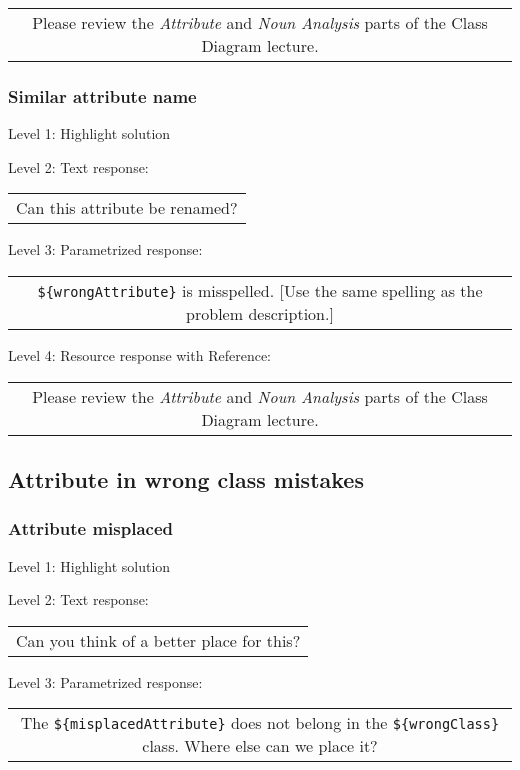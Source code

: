 \begin{tabular}{|c}
Please review the \textit{Attribute} and \textit{Noun Analysis} parts of the Class Diagram lecture.
\end{tabular} \medskip


\subsubsection{Similar attribute name}

\noindent Level 1: Highlight solution \medskip

\noindent Level 2: Text response: \medskip

\begin{tabular}{|c}
Can this attribute be renamed?
\end{tabular} \medskip

\noindent Level 3: Parametrized response: \medskip

\begin{tabular}{|c}
\verb|${wrongAttribute}| is misspelled. [Use the same spelling as the problem description.]
\end{tabular} \medskip

\noindent Level 4: Resource response with Reference:

\begin{tabular}{|c}
Please review the \textit{Attribute} and \textit{Noun Analysis} parts of the Class Diagram lecture.
\end{tabular} \medskip


\subsection{Attribute in wrong class mistakes}

\subsubsection{Attribute misplaced}

\noindent Level 1: Highlight solution \medskip

\noindent Level 2: Text response: \medskip

\begin{tabular}{|c}
Can you think of a better place for this?
\end{tabular} \medskip

\noindent Level 3: Parametrized response: \medskip

\begin{tabular}{|c}
The \verb|${misplacedAttribute}| does not belong in the \verb|${wrongClass}| class. Where else can we place it?
\end{tabular} \medskip

